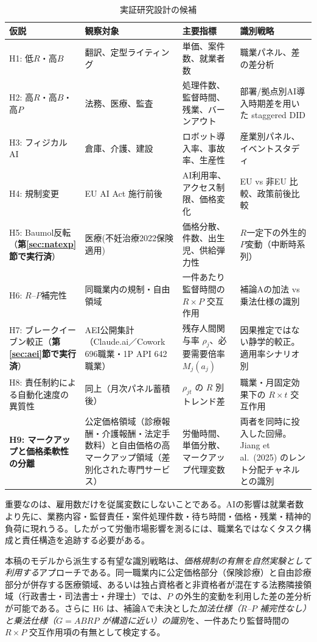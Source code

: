 \documentclass[11pt]{article}
\theoremstyle{plain}
\theoremstyle{definition}
\theoremstyle{remark}
\begin{document}
\begin{table}[h]\centering\small
\caption{実証研究設計の候補}\label{tab:design}
\begin{tabularx}{\textwidth}{@{}lXXX@{}}
\toprule
仮説 & 観察対象 & 主要指標 & 識別戦略 \\ \midrule
H1: 低$R$・高$B$ & 翻訳、定型ライティング & 単価、案件数、就業者数 & 職業パネル、差の差分析 \\
H2: 高$R$・高$B$・高$P$ & 法務、医療、監査 & 処理件数、監督時間、残業、バーンアウト & 部署/拠点別AI導入時期差を用いた staggered DID \\
H3: フィジカルAI & 倉庫、介護、建設 & ロボット導入率、事故率、生産性 & 産業別パネル、イベントスタディ \\
H4: 規制変更 & EU AI Act 施行前後 & AI利用率、アクセス制限、価格変化 & EU vs 非EU 比較、政策前後比較 \\
H5: Baumol反転（\textbf{第\ref{sec:natexp}節で実行済}） & 医療(不妊治療2022保険適用) & 価格分散、件数、出生児、供給弾力性 & $R$一定下の外生的$P$変動（中断時系列） \\
H6: $R$--$P$補完性 & 同職業内の規制・自由領域 & 一件あたり監督時間の $R{\times}P$ 交互作用 & 補論Aの加法 vs 乗法仕様の識別 \\
H7: ブレークイーブン較正（\textbf{第\ref{sec:aei}節で実行済}） & AEI公開集計（Claude.ai／Cowork 696職業・1P API 642職業） & 残存人間関与率 $\rho_j$、必要需要倍率 $M_j(a_j)$ & 因果推定ではない静学的較正。適用率シナリオ別 \\
H8: 責任制約による自動化速度の異質性 & 同上（月次パネル蓄積後） & $\rho_{jt}$ の $R$ 別トレンド差 & 職業・月固定効果下の $R\times t$ 交互作用 \\
\textbf{H9: マークアップと価格柔軟性の分離} & 公定価格領域（診療報酬・介護報酬・法定手数料）と自由価格の高マークアップ領域（差別化された専門サービス） & 労働時間、単価分散、マークアップ代理変数 & 両者を同時に投入した回帰。Jiang et al.\ (2025) のレント分配チャネルとの識別 \\
\bottomrule
\end{tabularx}
\end{table}

重要なのは、雇用数だけを従属変数にしないことである。AIの影響は就業者数より先に、業務内容・監督責任・案件処理件数・待ち時間・価格・残業・精神的負荷に現れうる。したがって労働市場影響を測るには、職業名ではなくタスク構成と責任構造を追跡する必要がある。

本稿のモデルから派生する有望な識別戦略は、\emph{価格規制の有無を自然実験として利用する}アプローチである。同一職業内に公定価格部分（保険診療）と自由診療部分が併存する医療領域、あるいは独占資格者と非資格者が混在する法務隣接領域（行政書士・司法書士・弁理士）では、$P$ の外生的変動を利用した差の差分析が可能である。さらに H6 は、補論Aで未決とした\emph{加法仕様（$R$--$P$ 補完性なし）と乗法仕様（$G=ABRP$ が構造に近い）の識別}を、一件あたり監督時間の $R\times P$ 交互作用項の有無として検定する。
\end{document}
